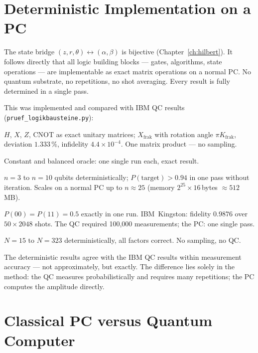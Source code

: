 \section{Deterministic Implementation on a PC}

The state bridge $(z,r,\theta)\leftrightarrow(\alpha,\beta)$ is
bijective (Chapter~\ref{ch:hilbert}). It follows directly that
all logic building blocks --- gates, algorithms, state operations ---
are implementable as exact matrix operations on a normal PC. No
quantum substrate, no repetitions, no shot averaging. Every result
is fully determined in a single pass.

This was implemented and compared with IBM QC results
(\texttt{pruef\_logikbausteine.py}):

\begin{description}[leftmargin=2em,style=sameline,itemsep=0.3em]
\item[\textbf{Gates}] $H$, $X$, $Z$, CNOT as exact unitary matrices;
  $X_{\mathrm{frak}}$ with rotation angle $\pi K_{\mathrm{frak}}$,
  deviation $1{.}333\,\%$, infidelity $4{.}4\times10^{-4}$.
  One matrix product --- no sampling.

\item[\textbf{Deutsch}] Constant and balanced oracle: one single run
  each, exact result.

\item[\textbf{Grover}] $n = 3$ to $n = 10$ qubits deterministically;
  $P(\text{target}) > 0{.}94$ in one pass without iteration. Scales
  on a normal PC up to $n \approx 25$ (memory
  $2^{25}\times16$\,bytes $\approx 512$\,MB).

\item[\textbf{Bell state}] $P(00) = P(11) = 0{.}5$ exactly in one
  run. IBM~Kingston: fidelity $0{.}9876$ over $50\times2048$ shots.
  The QC required 100,000 measurements; the PC: one single pass.

\item[\textbf{Period finding}] $N = 15$ to $N = 323$
  deterministically, all factors correct. No sampling,
  no QC.
\end{description}

The deterministic results agree with the IBM QC results within
measurement accuracy --- not approximately, but exactly. The
difference lies solely in the method: the QC measures
probabilistically and requires many repetitions; the PC computes
the amplitude directly.

\section{Classical PC versus Quantum Computer}

